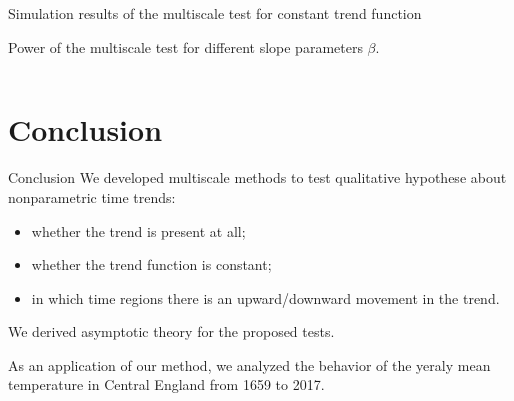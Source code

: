\documentclass[10pt, handout]{beamer}
\begin{document}
\begin{frame}{Simulation results of the multiscale test for constant trend function}
\scriptsize{\begin{table}[t]
\begin{center}
\caption{Size of the multiscale test.}
\label{tab:size_shape}

\end{center}
\end{table}}
\begin{center}
\normalsize{Power of the multiscale test for different slope parameters $\beta$.}
\end{center}
\vspace{-5mm}
\scriptsize{\begin{columns}
\begin{column}[b]{0.33\textwidth}
\begin{table}[t]
\centering
\caption{$\beta = 1.25$}\label{tab:power_050_ll_shape}

\end{table}
\end{column}
\begin{column}[b]{0.33\textwidth}
\begin{table}[t]
\centering
\caption{$\beta = 1.875$}\label{tab:power_075_ll_shape}

\end{table}
\end{column}
\begin{column}[b]{0.33\textwidth}
\begin{table}[t]
\centering
\caption{$\beta = 2.5$}\label{tab:power_100_ll_shape}

\end{table}
\end{column}
\end{columns}}
\end{frame}


\section{Conclusion}
\begin{frame}{Conclusion}
We developed multiscale methods to test qualitative hypothese about nonparametric time trends:
\begin{itemize}
\item whether the trend is present at all;
\item whether the trend function is constant;
\item in which time regions there is an upward/downward movement in the trend.
\end{itemize}
We derived asymptotic theory for the proposed tests.

As an application of our method, we analyzed the behavior of the yeraly mean temperature in Central England from 1659 to 2017.
\end{frame}
\end{document}
